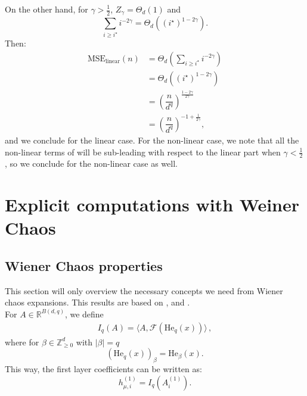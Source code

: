 \documentclass[]{article}
\numberwithin{equation}{section}
\theoremstyle{definition}
\newcommand{\RR}{\mathbb{R}}
\newcommand{\ZZ}{\mathbb{Z}}
\newcommand{\He}{\mathord{\mathrm{He}}}
\begin{document}
On the other hand, for $\gamma > \frac{1}{2}$, $Z_{\gamma} = \Theta_{d}(1)$ and
\begin{equation}
    \sum_{i \geq i^\star} i^{-2\gamma} = \Theta_{d}((i^\star )^{1-2\gamma}). 
\end{equation}
Then: 
\begin{align}
    \mathrm{MSE}_\mathrm{linear}(n) &  = \Theta_{d} \left ( \sum_{i \geq i^\star} i^{-2\gamma}\right ) \\
    & = \Theta_{d}((i^\star )^{1-2\gamma}) \\
    & = \left (\dfrac{n}{d^{q}}\right )^{\frac{1-2\gamma}{2\gamma}} \\
    & = \left (\dfrac{ n}{d^{q}}\right )^{-1 + \frac{1}{2\gamma}},
\end{align}
and we conclude  for the linear case. For the non-linear case, we note that all the non-linear terms of  will be sub-leading with respect to the linear part when $\gamma < \frac{1}{2}$, so we conclude   for the non-linear case as well. 

\section{Explicit computations with Weiner Chaos}
\label{section:explicit_computation_hermite}


\subsection{Wiener Chaos properties}

This section will only overview the necessary concepts we need from Wiener chaos expansions. This results are based on \cite{peccati2011wiener}, \cite{nourdin2012normal} and \cite{wen2025does}.   \\

For $A\in\RR^{B(d,q)}$, we define 
\begin{align}
    I_q(A)=\langle A,\mathcal F(\He_q(x))\rangle\, ,
\end{align}
where for $\beta \in \ZZ^{d}_{\geq0}$ with $|\beta|=q$
\begin{equation}
    (\mathrm{He}_q(x))_{\beta} = \He_{\beta}(x). 
\end{equation}
This way, the first layer coefficients can be written as: 
\begin{equation}
    h^{(1)}_{\mu,i} = I_{q}(A^{(1)}_{i}). 
\end{equation}
\end{document}

